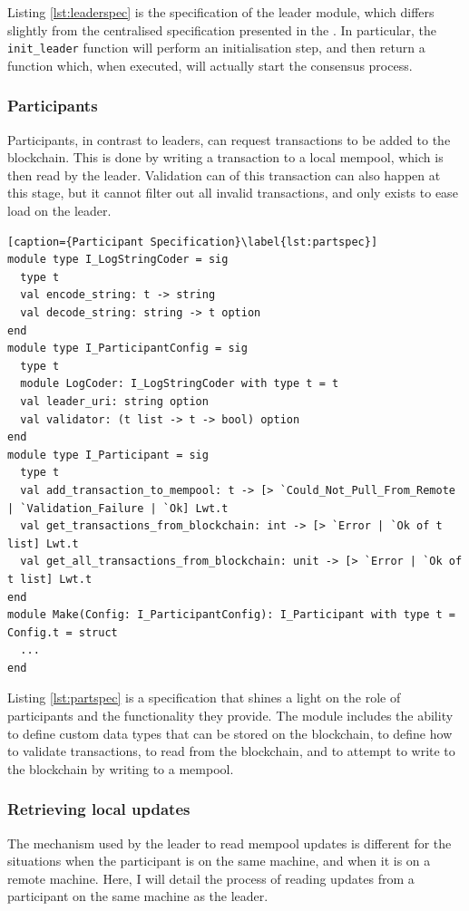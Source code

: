 \documentclass[12pt,a4paper,twoside,openright]{report}
\begin{document}
			Listing \ref{lst:leaderspec} is the specification of the leader module, which differs slightly from the centralised specification presented in the .
			In particular, the \texttt{init\_leader} function will perform an initialisation step, and then return a function which, when executed, will actually start the consensus process.

			\subsubsection*{Participants}
			Participants, in contrast to leaders, can request transactions to be added to the blockchain. 
			This is done by writing a transaction to a local mempool, which is then read by the leader.
			Validation can of this transaction can also happen at this stage, but it cannot filter out all invalid transactions, and only exists to ease load on the leader.\\

			\begin{lstlisting}[caption={Participant Specification}\label{lst:partspec}]
module type I_LogStringCoder = sig
  type t
  val encode_string: t -> string
  val decode_string: string -> t option
end
module type I_ParticipantConfig = sig
  type t
  module LogCoder: I_LogStringCoder with type t = t
  val leader_uri: string option
  val validator: (t list -> t -> bool) option
end
module type I_Participant = sig
  type t
  val add_transaction_to_mempool: t -> [> `Could_Not_Pull_From_Remote | `Validation_Failure | `Ok] Lwt.t
  val get_transactions_from_blockchain: int -> [> `Error | `Ok of t list] Lwt.t
  val get_all_transactions_from_blockchain: unit -> [> `Error | `Ok of t list] Lwt.t
end
module Make(Config: I_ParticipantConfig): I_Participant with type t = Config.t = struct
  ...
end
			\end{lstlisting}

			Listing \ref{lst:partspec} is a specification that shines a light on the role of participants and the functionality they provide.
			The module includes the ability to define custom data types that can be stored on the blockchain, to define how to validate transactions, to read from the blockchain, and to attempt to write to the blockchain by writing to a mempool.

			\subsubsection*{Retrieving local updates}
			The mechanism used by the leader to read mempool updates is different for the situations when the participant is on the same machine, and when it is on a remote machine. 
			Here, I will detail the process of reading updates from a participant on the same machine as the leader.\\
\end{document}
